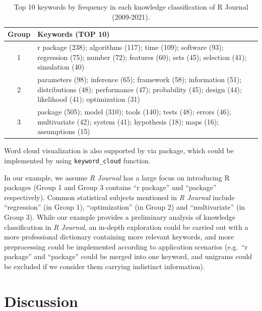 \begin{Schunk}
\begin{table}

\caption{\label{tab:tab2-2}Top 10 keywords by frequency in each knowledge classification of R Journal (2009-2021).}
\centering
\fontsize{7}{9}\selectfont
\begin{tabular}[t]{c|>{\centering\arraybackslash}p{10cm}}
\hline
Group & Keywords (TOP 10)\\
\hline
1 & r package (238); algorithms (117); time (109); software (93); regression (75); number (72); features (60); sets (45); selection (41); simulation (40)\\
\hline
2 & parameters (98); inference (65); framework (58); information (51); distributions (48); performance (47); probability (45); design (44); likelihood (41); optimization (31)\\
\hline
3 & package (505); model (310); tools (140); tests (48); errors (46); multivariate (42); system (41); hypothesis (18); maps (16); assumptions (15)\\
\hline
\end{tabular}
\end{table}

\end{Schunk}

Word cloud visualization is also supported by  via
 package, which could be implemented by using
\texttt{keyword\_cloud} function.

In our example, we assume \emph{R Journal} has a large focus on
introducing R packages (Group 1 and Group 3 contains ``r package'' and
``package'' respectively). Common statistical subjects mentioned in
\emph{R Journal} include ``regression'' (in Group 1), ``optimization''
(in Group 2) and ``multivariate'' (in Group 3). While our example
provides a preliminary analysis of knowledge classification in \emph{R
Journal}, an in-depth exploration could be carried out with a more
professional dictionary containing more relevant keywords, and more
preprocessing could be implemented according to application scenarios
(e.g.~``r package'' and ``package'' could be merged into one keyword,
and unigrams could be excluded if we consider them carrying indistinct
information).

\hypertarget{discussion}{%
\section{Discussion}\label{discussion}}

